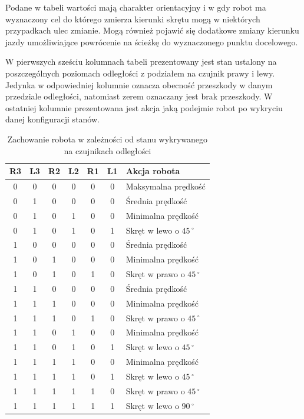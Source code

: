 Podane w tabeli wartości mają charakter orientacyjny i w gdy robot ma
wyznaczony cel do którego zmierza kierunki skrętu mogą w niektórych przypadkach
ulec zmianie. Mogą również pojawić się dodatkowe zmiany kierunku jazdy umożliwiające
powrócenie na ścieżkę do wyznaczonego punktu docelowego.

W pierwszych sześciu kolumnach tabeli prezentowany jest stan ustalony na poszczególnych
poziomach odległości z podziałem na czujnik prawy i lewy. Jedynka w odpowiedniej
kolumnie oznacza obecność przeszkody w danym przedziale odległości, natomiast
zerem oznaczany jest brak przeszkody. W ostatniej kolumnie prezentowana jest
akcja jaką podejmie robot po wykryciu danej konfiguracji stanów.

\begin{table}[hb]
\centering
\caption{Zachowanie robota w zależności od stanu wykrywanego na czujnikach odległości}
   	\begin{tabular}{ | c | c | c | c | c | c | p{4.75cm} |} \hline
   		R3 & L3 & R2 & L2 & R1 & L1 & Akcja robota \\ \hline
   		0  & 0  & 0  & 0  & 0  & 0  & Maksymalna prędkość\\ \hline
   		0  & 1  & 0  & 0  & 0  & 0  & Średnia prędkość \\ \hline
   		0  & 1  & 0  & 1  & 0  & 0  & Minimalna prędkość \\ \hline
   		0  & 1  & 0  & 1  & 0  & 1  & Skręt w lewo o $45\,^{\circ}$ \\ \hline 
   		1  & 0  & 0  & 0  & 0  & 0  & Średnia prędkość \\ \hline
   		1  & 0  & 1  & 0  & 0  & 0  & Minimalna prędkość \\ \hline
   		1  & 0  & 1  & 0  & 1  & 0  & Skręt w prawo o $45\,^{\circ}$  \\ \hline
   		1  & 1  & 0  & 0  & 0  & 0  & Średnia prędkość \\ \hline
   		1  & 1  & 1  & 0  & 0  & 0  & Minimalna prędkość \\ \hline
   		1  & 1  & 1  & 0  & 1  & 0  & Skręt w prawo o $45\,^{\circ}$ \\ \hline
   		1  & 1  & 0  & 1  & 0  & 0  & Minimalna prędkość \\ \hline
   		1  & 1  & 0  & 1  & 0  & 1  & Skręt w lewo o $45\,^{\circ}$ \\ \hline 
   		1  & 1  & 1  & 1  & 0  & 0  & Minimalna prędkość \\ \hline 
   		1  & 1  & 1  & 1  & 0  & 1  & Skręt w lewo o $45\,^{\circ}$ \\ \hline 
   		1  & 1  & 1  & 1  & 1  & 0  & Skręt w prawo o $45\,^{\circ}$ \\ \hline 
   		1  & 1  & 1  & 1  & 1  & 1  & Skręt w lewo o $90\,^{\circ}$ \\ \hline
   	\end{tabular}
\label{ObstacleAvoidTable}
\end{table}
\newpage

